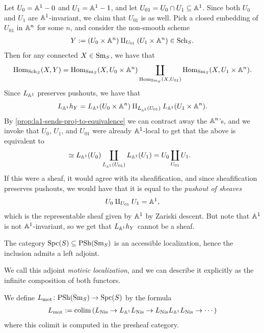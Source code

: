 \documentclass[11pt,openany]{book}
\renewcommand{\Pre}{\mathrm{PSh}}
\begin{document}
\begin{example} \cite[3.2.7]{MV} Let $U_0 = \mathbb{A}^1-0$ and $U_1 = \mathbb{A}^1-1$, and let $U_{01} = U_0 \cap U_1 \subseteq \mathbb{A}^1$. Since both $U_0$ and $U_1$ are $\mathbb{A}^1$-invariant, we claim that $U_{01}$ is as well. Pick a closed embedding of $U_{01}$ in $\mathbb{A}^n$ for some $n$, and consider the non-smooth scheme
\begin{align*}
    Y:=(U_0 \times \mathbb{A}^n) \amalg_{U_{01}} (U_1 \times \mathbb{A}^n) \in \mathrm{Sch}_S.
\end{align*}
Then for any connected $X\in \mathrm{Sm}_S$, we have that
\begin{align*}
    \mathrm{Hom}_{\mathrm{Sch}_S}(X,Y) = \mathrm{Hom}_{\mathrm{Sm}_S}(X, U_0 \times \mathbb{A}^n) \coprod_{\mathrm{Hom}_{\mathrm{Sm}_S}(X,U_{01})} \mathrm{Hom}_{\mathrm{Sm}_S}(X, U_1 \times \mathbb{A}^n).
\end{align*}
%
Since $L_{\mathbb{A}^1}$ preserves pushouts, we have that
\begin{align*}
    L_{\mathbb{A}^1} h_Y = L_{\mathbb{A}^1}(U_0 \times\mathbb{A}^n) \amalg_{L_{\mathbb{A}^1}(U_{01})} L_{\mathbb{A}^1}(U_1 \times \mathbb{A}^n).
\end{align*}
By \autoref{prop:la1-sends-proj-to-equivalence} we can contract away the $\mathbb{A}^n$'s, and we invoke that $U_0$, $U_1$, and $U_{01}$ were already $\mathbb{A}^1$-local to get that the above is equivalent to
\begin{align*}
    &\simeq L_{\mathbb{A}^1}(U_0) \coprod_{L_{\mathbb{A}^1}(U_{01})} L_{\mathbb{A}^1}(U_1) = U_0 \coprod_{U_{01}} U_1.
\end{align*}
If this were a sheaf, it would agree with its sheafification, and since sheafification preserves pushouts, we would have that it is equal to the \textit{pushout of sheaves}
\begin{align*}
    U_0 \amalg_{U_{01}} U_1 = \mathbb{A}^1,
\end{align*}
which is the representable sheaf given by $\mathbb{A}^1$ by Zariski descent. But note that $\mathbb{A}^1$ is not $\mathbb{A}^1$-invariant, so we get that $L_{\mathbb{A}^1}h_Y$ cannot be a sheaf.
\end{example}


\begin{proposition} The category $\mathrm{Spc}(S) \subseteq \mathrm{PSh}(\mathrm{Sm}_S)$ is an accessible localization, hence the inclusion admits a left adjoint.
\end{proposition}
We call this adjoint \textit{motivic localization}, and we can describe it explicitly as the infinite composition of both functors.

\begin{definition} We define $L_\mot \colon \Pre(\Sm_S) \to \Spc(S)$ by the formula
\begin{align*}
    L_{\mathrm{mot}} := \mathrm{colim} \left( L_{\mathrm{Nis}} \to L_{\mathbb{A}^1} L_{\mathrm{Nis}} \to L_{\mathrm{Nis}} L_{\mathbb{A}^1}L_{\mathrm{Nis}} \to \cdots \right)
\end{align*}
where this colimit is computed in the presheaf category.
\end{definition}
\end{document}
